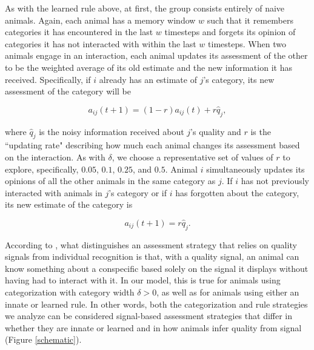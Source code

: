 As with the learned rule above, at first, the group consists entirely of naive animals. Again, each animal has a memory window $w$ such that it remembers categories it has encountered in the last $w$ timesteps and forgets its opinion of categories it has not interacted with within the last $w$ timesteps. When two animals engage in an interaction, each animal updates its assessment of the other to be the weighted average of its old estimate and the new information it has received. Specifically, if $i$ already has an estimate of $j$'s category, its new assessment of the category will be
\begin{linenomath*}
\begin{equation*}
a_{ij}(t+1)=(1-r)a_{ij}(t)+r\hat{q}_j,
\end{equation*}
\end{linenomath*}
where $\hat{q}_j$ is the noisy information received about $j$'s quality and $r$ is the ``updating rate" describing how much each animal changes its assessment based on the interaction. As with $\delta$, we choose a representative set of values of $r$ to explore, specifically, $0.05$, $0.1$, $0.25$, and $0.5$. Animal $i$ simultaneously updates its opinions of all the other animals in the same category as $j$.
If $i$ has not previously interacted with animals in $j$'s category or if $i$ has forgotten about the category, its new estimate of the category is
\begin{linenomath*}
\begin{equation*}
a_{ij}(t+1)=r\hat{q}_j.
\end{equation*}
\end{linenomath*}

According to \citet{sheehan2016evotradeoff}, what distinguishes an assessment strategy that relies on quality signals from individual recognition is that, with a quality signal, an animal can know something about a conspecific based solely on the signal it displays without having had to interact with it. In our model, this is true for animals using categorization with category width $\delta>0$, as well as for animals using either an innate or learned rule. In other words, both the categorization and rule strategies we analyze can be considered signal-based assessment strategies that differ in whether they are innate or learned and in how animals infer quality from signal (Figure \ref{schematic}). 
 
